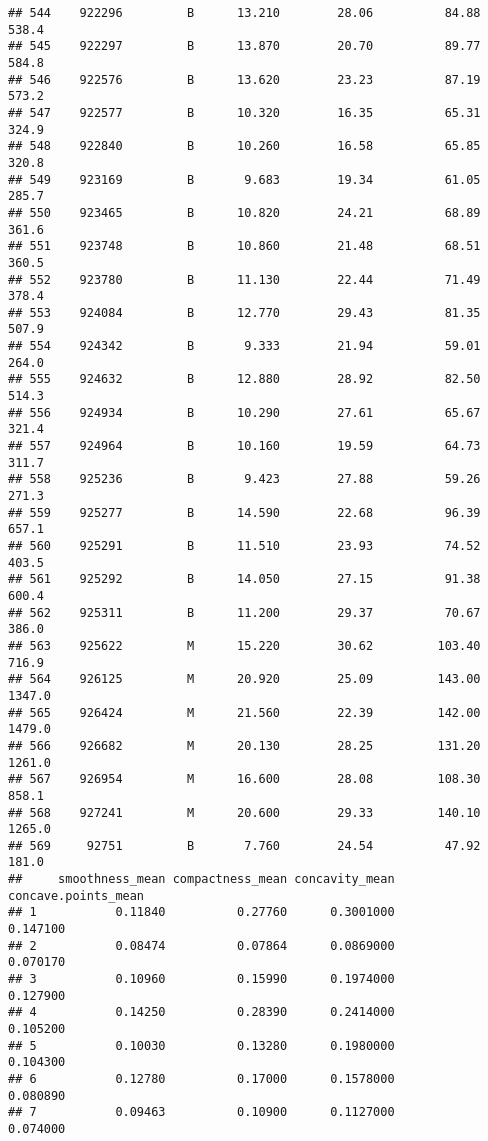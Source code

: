 \documentclass[
]{article}
\begin{document}
\begin{verbatim}
## 544    922296         B      13.210        28.06          84.88     538.4
## 545    922297         B      13.870        20.70          89.77     584.8
## 546    922576         B      13.620        23.23          87.19     573.2
## 547    922577         B      10.320        16.35          65.31     324.9
## 548    922840         B      10.260        16.58          65.85     320.8
## 549    923169         B       9.683        19.34          61.05     285.7
## 550    923465         B      10.820        24.21          68.89     361.6
## 551    923748         B      10.860        21.48          68.51     360.5
## 552    923780         B      11.130        22.44          71.49     378.4
## 553    924084         B      12.770        29.43          81.35     507.9
## 554    924342         B       9.333        21.94          59.01     264.0
## 555    924632         B      12.880        28.92          82.50     514.3
## 556    924934         B      10.290        27.61          65.67     321.4
## 557    924964         B      10.160        19.59          64.73     311.7
## 558    925236         B       9.423        27.88          59.26     271.3
## 559    925277         B      14.590        22.68          96.39     657.1
## 560    925291         B      11.510        23.93          74.52     403.5
## 561    925292         B      14.050        27.15          91.38     600.4
## 562    925311         B      11.200        29.37          70.67     386.0
## 563    925622         M      15.220        30.62         103.40     716.9
## 564    926125         M      20.920        25.09         143.00    1347.0
## 565    926424         M      21.560        22.39         142.00    1479.0
## 566    926682         M      20.130        28.25         131.20    1261.0
## 567    926954         M      16.600        28.08         108.30     858.1
## 568    927241         M      20.600        29.33         140.10    1265.0
## 569     92751         B       7.760        24.54          47.92     181.0
##     smoothness_mean compactness_mean concavity_mean concave.points_mean
## 1           0.11840          0.27760      0.3001000            0.147100
## 2           0.08474          0.07864      0.0869000            0.070170
## 3           0.10960          0.15990      0.1974000            0.127900
## 4           0.14250          0.28390      0.2414000            0.105200
## 5           0.10030          0.13280      0.1980000            0.104300
## 6           0.12780          0.17000      0.1578000            0.080890
## 7           0.09463          0.10900      0.1127000            0.074000

\end{verbatim}
\end{document}
